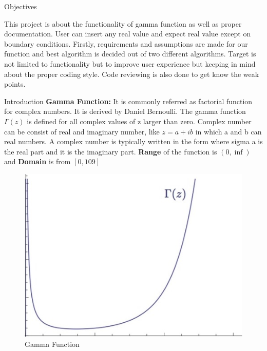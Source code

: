 \documentclass[final]{beamer}
\newlength{\onecolwid}
\begin{document}
\begin{frame}
\begin{columns}[t]
\begin{column}{\onecolwid}
\begin{exampleblock}{Objectives}

\small{This project is about the functionality of gamma function as well as proper documentation. User can insert any real value and expect real value except on boundary conditions. Firstly, requirements and assumptions are made for our function and best algorithm is decided out of two different algorithms. Target is not limited to functionality but to improve user experience but keeping in mind about the proper coding style. Code reviewing is also done to get know the weak points. }

\end{exampleblock}


\begin{exampleblock}{Introduction}
\small{\textbf{Gamma Function: } It is commonly referred as factorial function for complex numbers. It is derived by Daniel Bernoulli. The gamma function $\Gamma(z)$ is defined for all complex values of z larger than zero. Complex number can be consist of real and imaginary number, like $z = a + i b$ in which a and b can real numbers. A complex number is typically written in the form where sigma a is the real part and it is the imaginary part. \textbf{Range} of the function is $(0,\inf)$ and \textbf{Domain} is from $[0, 109]$}
\end{exampleblock}


\begin{figure}
\includegraphics[width=1\linewidth]{img/d4_2.jpg}
\caption{Gamma Function}
\label{fig:Gamma Function}
\end{figure}


\end{column}
\end{columns}
\end{frame}
\end{document}
